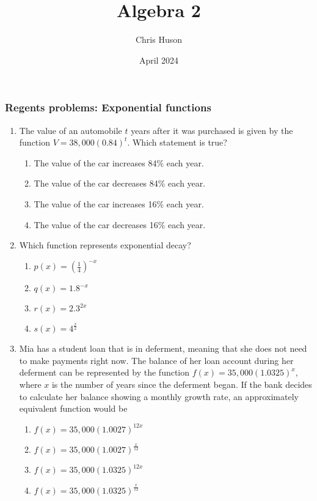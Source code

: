 \documentclass[12pt, twoside]{article}
\title{Algebra 2}
\author{Chris Huson}
\date{April 2024}
\begin{document}
\subsubsection*{Regents problems: Exponential functions}
\begin{enumerate}[itemsep=0.5cm]
\item The value of an automobile $t$ years after it was purchased is given by the function $V = 38,000(0.84)^t$. Which statement is true? %
\begin{enumerate}
    \item The value of the car increases 84\% each year.
    \item The value of the car decreases 84\% each year.
    \item The value of the car increases 16\% each year.
    \item The value of the car decreases 16\% each year.
\end{enumerate}

\item Which function represents exponential decay? %
\begin{enumerate}
    \item $\displaystyle p(x) = \left(\frac{1}{4}\right)^{-x}$
    \item $q(x) = 1.8^{-x}$
    \item $r(x) = 2.3^{2x}$
    \item $s(x) = 4^{\frac{x}{2}}$
\end{enumerate}

\item  %
Mia has a student loan that is in deferment, meaning that she does
not need to make payments right now. The balance of her loan
account during her deferment can be represented by the function
$f(x) = 35,000 (1.0325)^x$, where $x$ is the number of years since the
deferment began. If the bank decides to calculate her balance showing
a monthly growth rate, an approximately equivalent function would be
\begin{enumerate}
    \item $f(x) = 35,000 (1.0027)^{12x}$
    \item $\displaystyle f(x) = 35,000 (1.0027)^{\frac{x}{12}}$
    \item $f(x) = 35,000 (1.0325)^{12x}$
    \item $\displaystyle f(x) = 35,000 (1.0325)^{\frac{x}{12}}$
\end{enumerate}


\end{enumerate}
\end{document}
